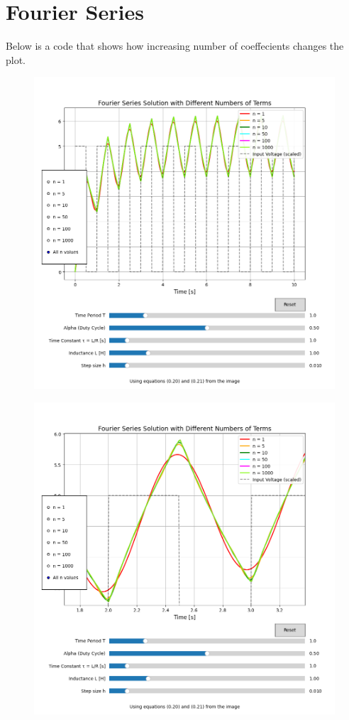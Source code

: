 \documentclass[12pt,a4paper]{report}
\begin{document}
\section{Fourier Series}
Below is a code that shows how increasing number of coeffecients changes the plot.
\begin{figure}
    \centering
    \includegraphics[width=1\linewidth]{figs/conv-1.png}
    \label{fig:enter-label}
\end{figure}
\begin{figure}
    \centering
    \includegraphics[width=1\linewidth]{figs/conv-2.png}
    \label{fig:enter-label}
\end{figure}
\end{document}
